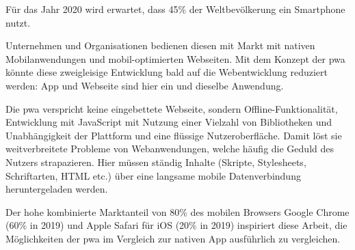 Für das Jahr 2020 wird erwartet, dass 45\% der Weltbevölkerung ein Smartphone nutzt.
\cite{StatistaSmartphonesWorldwide}
\cite{StatistaWorldPopulation}

Unternehmen und Organisationen bedienen diesen mit Markt mit nativen Mobilanwendungen und mobil-optimierten Webseiten.
Mit dem Konzept der \ac{pwa} könnte diese zweigleisige Entwicklung bald auf die Webentwicklung reduziert werden: App und Webseite sind hier ein und dieselbe Anwendung. 


Die \ac{pwa} verspricht keine eingebettete Webseite, sondern Offline-Funktionalität, Entwicklung mit JavaScript mit Nutzung einer Vielzahl von Bibliotheken und Unabhängigkeit der Plattform und eine flüssige Nutzeroberfläche. Damit löst sie weitverbreitete Probleme von Webanwendungen, welche häufig die Geduld des Nutzers strapazieren. Hier müssen ständig Inhalte (Skripte, Stylesheets, Schriftarten, HTML etc.) über eine langsame mobile Datenverbindung heruntergeladen werden.

Der hohe kombinierte Marktanteil von 80\% des mobilen Browsers Google Chrome (60\% in 2019) und Apple Safari für iOS (20\% in 2019) inspiriert diese Arbeit, die Möglichkeiten der \ac{pwa} im Vergleich zur nativen App ausführlich zu vergleichen. 
\cite{StatistaMobileBrowserMarketShare}

